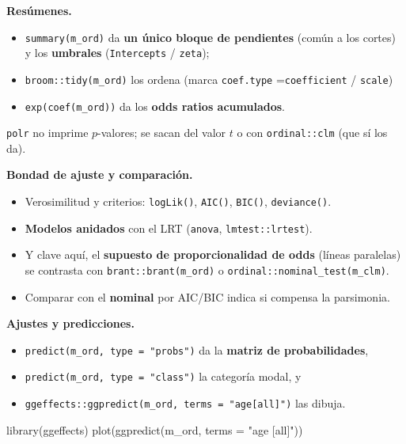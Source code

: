 \documentclass[
  letterpaper,
  DIV=11,
  numbers=noendperiod]{scrartcl}
\newenvironment{Shaded}{\begin{snugshade}}{\end{snugshade}}
\newcommand{\AttributeTok}[1]{\textcolor[rgb]{0.40,0.45,0.13}{#1}}
\newcommand{\FunctionTok}[1]{\textcolor[rgb]{0.28,0.35,0.67}{#1}}
\newcommand{\NormalTok}[1]{\textcolor[rgb]{0.00,0.23,0.31}{#1}}
\newcommand{\StringTok}[1]{\textcolor[rgb]{0.13,0.47,0.30}{#1}}
\providecommand{\tightlist}{%
  \setlength{\itemsep}{0pt}\setlength{\parskip}{0pt}}\usepackage{longtable,booktabs,array}
\begin{document}
\begin{tcolorbox}
\textbf{Resúmenes.}

\begin{itemize}
\tightlist
\item
  \texttt{summary(m\_ord)} da \textbf{un único bloque de pendientes}
  (común a los cortes) y los \textbf{umbrales} (\texttt{Intercepts} /
  \texttt{zeta});
\item
  \texttt{broom::tidy(m\_ord)} los ordena (marca \texttt{coef.type}
  =\texttt{coefficient} / \texttt{scale})\\
\item
  \texttt{exp(coef(m\_ord))} da los \textbf{odds ratios acumulados}.
\end{itemize}

\texttt{polr} no imprime \(p\)-valores; se sacan del valor \(t\) o con
\texttt{ordinal::clm} (que sí los da).

\textbf{Bondad de ajuste y comparación.}

\begin{itemize}
\tightlist
\item
  Verosimilitud y criterios: \texttt{logLik()}, \texttt{AIC()},
  \texttt{BIC()}, \texttt{deviance()}.
\item
  \textbf{Modelos anidados} con el LRT (\texttt{anova},
  \texttt{lmtest::lrtest}).
\item
  Y clave aquí, el \textbf{supuesto de proporcionalidad de odds} (líneas
  paralelas) se contrasta con \texttt{brant::brant(m\_ord)} o
  \texttt{ordinal::nominal\_test(m\_clm)}.
\item
  Comparar con el \textbf{nominal} por AIC/BIC indica si compensa la
  parsimonia.
\end{itemize}

\textbf{Ajustes y predicciones.}

\begin{itemize}
\tightlist
\item
  \texttt{predict(m\_ord,\ type\ =\ "probs")} da la \textbf{matriz de
  probabilidades},
\item
  \texttt{predict(m\_ord,\ type\ =\ "class")} la categoría modal, y
\item
  \texttt{ggeffects::ggpredict(m\_ord,\ terms\ =\ "age{[}all{]}")} las
  dibuja.
\end{itemize}

\end{tcolorbox}

\begin{Shaded}
\begin{Highlighting}[]
\FunctionTok{library}\NormalTok{(ggeffects)}
\FunctionTok{plot}\NormalTok{(}\FunctionTok{ggpredict}\NormalTok{(m\_ord, }\AttributeTok{terms =} \StringTok{"age [all]"}\NormalTok{))}
\end{Highlighting}
\end{Shaded}
\end{document}
